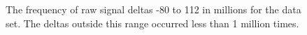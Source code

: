 \begin{figure}
	\centering

	\caption[The frequency of raw signal deltas.]{\label{fig:delta-hist}The frequency of raw signal deltas -80 to 112 in millions for the data set. The deltas outside this range occurred less than 1 million times.}
\end{figure}
